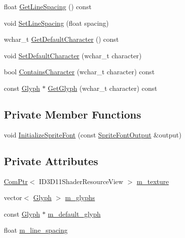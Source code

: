 \begin{DoxyCompactItemize}
\item 
float \hyperlink{classmage_1_1_sprite_font_ae90ee76625716c6cbce851b6fd14524b}{Get\+Line\+Spacing} () const
\item 
void \hyperlink{classmage_1_1_sprite_font_adc013412c3b59e40c326552b77d9c457}{Set\+Line\+Spacing} (float spacing)
\item 
wchar\+\_\+t \hyperlink{classmage_1_1_sprite_font_a06c0cfea70ad01946447e7eed901dc57}{Get\+Default\+Character} () const
\item 
void \hyperlink{classmage_1_1_sprite_font_a0b0feb25673d6f9d9e3215167800d817}{Set\+Default\+Character} (wchar\+\_\+t character)
\item 
bool \hyperlink{classmage_1_1_sprite_font_a01836c4197661dbdd66c624d8dc6a7c3}{Contains\+Character} (wchar\+\_\+t character) const
\item 
const \hyperlink{structmage_1_1_glyph}{Glyph} $\ast$ \hyperlink{classmage_1_1_sprite_font_aa13424a1e0153ffb9433bb2cb416360b}{Get\+Glyph} (wchar\+\_\+t character) const
\end{DoxyCompactItemize}
\subsection*{Private Member Functions}
\begin{DoxyCompactItemize}
\item 
void \hyperlink{classmage_1_1_sprite_font_ae0edccbf98f4bd3b3195fa602baee121}{Initialize\+Sprite\+Font} (const \hyperlink{structmage_1_1_sprite_font_output}{Sprite\+Font\+Output} \&output)
\end{DoxyCompactItemize}
\subsection*{Private Attributes}
\begin{DoxyCompactItemize}
\item 
\hyperlink{namespacemage_ae74f374780900893caa5555d1031fd79}{Com\+Ptr}$<$ I\+D3\+D11\+Shader\+Resource\+View $>$ \hyperlink{classmage_1_1_sprite_font_ad3740a71e8dfeb70e167c33fec855720}{m\+\_\+texture}
\item 
vector$<$ \hyperlink{structmage_1_1_glyph}{Glyph} $>$ \hyperlink{classmage_1_1_sprite_font_acf4efc927a2ca3fc0eb297ed080ddfbb}{m\+\_\+glyphs}
\item 
const \hyperlink{structmage_1_1_glyph}{Glyph} $\ast$ \hyperlink{classmage_1_1_sprite_font_ad25667d3bfb539b71b39124fdc8ed6d6}{m\+\_\+default\+\_\+glyph}
\item 
float \hyperlink{classmage_1_1_sprite_font_a2b6de0c210a7cf5c72dd1bb69bff7a3b}{m\+\_\+line\+\_\+spacing}
\end{DoxyCompactItemize}


